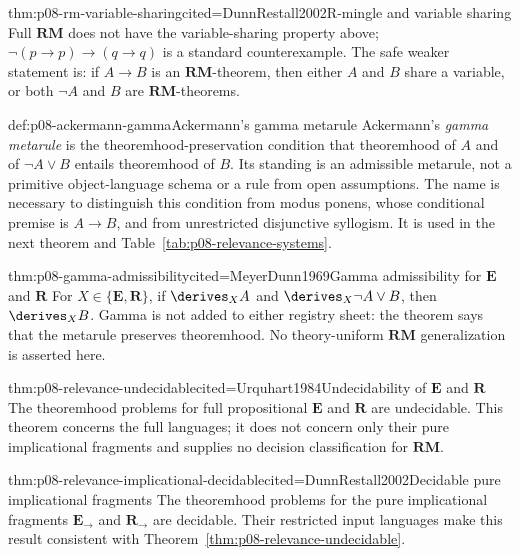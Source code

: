 \begin{hbtheorem}{thm:p08-rm-variable-sharing}{cited=DunnRestall2002}{R-mingle and variable sharing}
Full \(\mathbf{RM}\) does not have the variable-sharing property above;
\(\neg(p\to p)\to(q\to q)\) is a standard counterexample.  The safe weaker
statement is: if \(A\to B\) is an \(\mathbf{RM}\)-theorem, then either
\(A\) and \(B\) share a variable, or both \(\neg A\) and \(B\) are
\(\mathbf{RM}\)-theorems.
\end{hbtheorem}

\begin{hbdefinition}{def:p08-ackermann-gamma}{Ackermann's gamma metarule}
Ackermann's \emph{gamma metarule} is the theoremhood-preservation condition
that theoremhood of \(A\) and of \(\neg A\lor B\) entails theoremhood of
\(B\).  Its standing is an admissible metarule, not a primitive object-language
schema or a rule from open assumptions.  The name is necessary to distinguish
this condition from modus ponens, whose conditional premise is \(A\to B\),
and from unrestricted disjunctive syllogism.  It is used in the next theorem
and Table~\ref{tab:p08-relevance-systems}.
\end{hbdefinition}

\begin{hbtheorem}{thm:p08-gamma-admissibility}{cited=MeyerDunn1969}{Gamma admissibility for \(\mathbf E\) and \(\mathbf R\)}
For \(X\in\{\mathbf E,\mathbf R\}\), if
\(\derives_X A\) and \(\derives_X\neg A\lor B\), then
\(\derives_X B\).  Gamma is not added to either registry sheet: the theorem
says that the metarule preserves theoremhood.  No theory-uniform
\(\mathbf{RM}\) generalization is asserted here.
\end{hbtheorem}

\begin{hbtheorem}{thm:p08-relevance-undecidable}{cited=Urquhart1984}{Undecidability of \(\mathbf E\) and \(\mathbf R\)}
The theoremhood problems for full propositional \(\mathbf E\) and
\(\mathbf R\) are undecidable.  This theorem concerns the full languages; it
does not concern only their pure implicational fragments and supplies no
decision classification for \(\mathbf{RM}\).
\end{hbtheorem}

\begin{hbtheorem}{thm:p08-relevance-implicational-decidable}{cited=DunnRestall2002}{Decidable pure implicational fragments}
The theoremhood problems for the pure implicational fragments
\(\mathbf E_{\to}\) and \(\mathbf R_{\to}\) are decidable.  Their restricted
input languages make this result consistent with
Theorem~\ref{thm:p08-relevance-undecidable}.
\end{hbtheorem}

